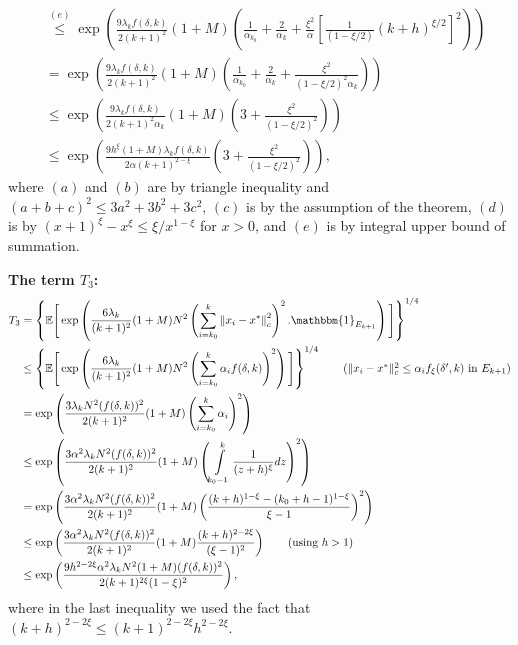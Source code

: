 \documentclass[letterpaper, 10 pt]{article}
\newcommand{\E}{\mathbb{E}}
\begin{document}
\begin{align*}
    &\overset{(e)}{\leq} \exp\left(\frac{9\lambda_kf(\delta,k)}{2(k+1)^2}(1+M) \left( \frac{1}{\alpha_{k_0}} + \frac{2}{\alpha_k} +\frac{\xi^2}{\alpha}\left[\frac{1}{(1-\xi/2)} (k+h)^{\xi/2} \right]^2 \right) \right) \\
    &= \exp\left(\frac{9\lambda_k f(\delta,k)}{2(k+1)^2}(1+M) \left( \frac{1}{\alpha_{k_0}} + \frac{2}{\alpha_k} +\frac{\xi^2}{(1-\xi/2)^2\alpha_k} \right) \right)\\
    &\leq \exp\left(\frac{9\lambda_k f(\delta,k)}{2(k+1)^2\alpha_k}(1+M) \left( 3 +\frac{\xi^2}{(1-\xi/2)^2} \right) \right)\tag{$k\geq k_0$}\\
    &\leq \exp\left(\frac{9h^\xi(1+M)\lambda_k f(\delta,k)}{2\alpha (k+1)^{2-\xi}} \left( 3 +\frac{\xi^2}{(1-\xi/2)^2} \right) \right),
\end{align*}
where $(a)$ and $(b)$ are by triangle inequality and $(a+b+c)^2\leq 3a^2+3b^2+3c^2$, $(c)$ is by the assumption of the theorem, $(d)$ is by $(x+1)^\xi-x^\xi\leq \xi/x^{1-\xi}$ for $x>0$, and $(e)$ is by integral upper bound of summation.



\textbf{The term $T_3$:}
\begin{align*}
    T_3&=\left\{\E\Bigg[\exp\left( \frac{6\lambda_k}{(k+1)^2}(1+M)N^2 \left(\sum\limits_{i=k_0}^{k}\left\|x_i-x^*\right\|_c^2\right)^2 .\mathbbm{1}_{E_{k+1}}\right)\Bigg]\right\}^{1/4} \\
    &\leq \left\{\E\Bigg[\exp\left( \frac{6\lambda_k}{(k+1)^2}(1+M)N^2 \left( \sum\limits_{i=k_0}^{k}\alpha_i f(\delta,k)\right)^2 \right)\Bigg]\right\}^{1/4}\tag{$\|x_i-x^*\|^2_c \leq \alpha_i f_\xi(\delta',k)$ in $E_{k+1}$}\\
    &= \exp\left( \frac{3\lambda_k N^2(f(\delta,k))^2}{2(k+1)^2}(1+M)\left(\sum\limits_{i=k_0}^{k}\alpha_i \right)^2 \right)\\
    &\leq \exp\left( \frac{3\alpha^2\lambda_k N^2 (f(\delta,k))^2}{2(k+1)^2}(1+M)\left(\int\limits_{k_0-1}^{k}\frac{1}{(z+h)^{\xi}} dz\right)^2  \right)\\
    &= \exp\left( \frac{3\alpha^2\lambda_k N^2(f(\delta,k))^2}{2(k+1)^2}(1+M)\left(\frac{(k+h)^{1-\xi}-(k_0+h-1)^{1-\xi}}{\xi-1} \right)^2 \right) \\
    &\leq \exp\left( \frac{3\alpha^2\lambda_k N^2(f(\delta,k))^2}{2(k+1)^2}(1+M)\frac{(k+h)^{2-2\xi}}{(\xi-1)^2}  \right)\tag{using $h>1$}\\
    &\leq \exp\left( \frac{9h^{2-2\xi}\alpha^2\lambda_k N^2(1+M)(f(\delta,k))^2}{2(k+1)^{2\xi}(1-\xi)^2}  \right),
\end{align*}
where in the last inequality we used the fact that $(k+h)^{2-2\xi}\leq (k+1)^{2-2\xi}h^{2-2\xi}$.\\
\end{document}
